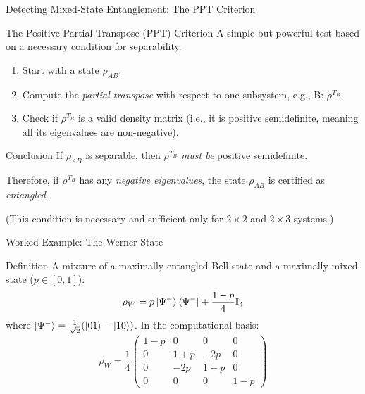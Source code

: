 
\begin{frame}{Detecting Mixed-State Entanglement: The PPT Criterion}
  \begin{block}{The Positive Partial Transpose (PPT) Criterion}
    A simple but powerful test based on a necessary condition for separability.
    \begin{enumerate}
      \item<1-> Start with a state $\rho_{AB}$.
        \pause
      \item<2-> Compute the \emph{partial transpose} with respect to one
        subsystem, e.g., B: $\rho^{T_B}$.
        \pause
      \item<3-> Check if $\rho^{T_B}$ is a valid density matrix (i.e., it is
        positive semidefinite, meaning all its eigenvalues are non-negative).
    \end{enumerate}
  \end{block}
  \pause
  \begin{alertblock}{Conclusion}
    If $\rho_{AB}$ is separable, then $\rho^{T_B}$ \emph{must be} positive semidefinite.

    Therefore, if $\rho^{T_B}$ has any \emph{negative eigenvalues}, the state
    $\rho_{AB}$ is certified as \emph{entangled}.

    \footnotesize{(This condition is necessary and sufficient only for
    $2\times2$ and $2\times3$ systems.)}
  \end{alertblock}
\end{frame}


\begin{frame}{Worked Example: The Werner State}
  \begin{block}{Definition}
    A mixture of a maximally entangled Bell state and a maximally mixed state ($p \in [0, 1]$):
    \[ \rho_W = p \ket{\Psi^-}\bra{\Psi^-} + \frac{1-p}{4} \mathbb{I}_4 \]
    where $\ket{\Psi^-} = \frac{1}{\sqrt{2}}(\ket{01}-\ket{10})$. In the computational basis:
    \[
      \rho_W = \frac{1}{4}
      \begin{pmatrix}
        1-p & 0 & 0 & 0 \\
        0 & 1+p & -2p & 0 \\
        0 & -2p & 1+p & 0 \\
        0 & 0 & 0 & 1-p
      \end{pmatrix}
    \]
  \end{block}
\end{frame}

